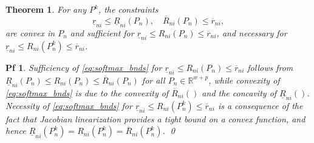 \documentclass[10pt,a4paper]{amsart}
\newtheorem{thm}{Theorem}
\newtheorem{pf}{Pf}
\DeclareMathOperator{\LSE}{LSE}
\begin{document}
\begin{thm}
For any $P^k$, the constraints
\begin{equation}\label{eq:softmax_bnds}
\underline{r}_{ni} \leq \underline{R}_{ni}(P_n), 
\quad
\overline{R}_{ni}(P_n) \leq \overline{r}_{ni},
\end{equation}
are convex in $P_n$ and sufficient for $\underline{r}_{ni} \leq R_{ni}(P_n) \leq \overline{r}_{ni}$, and necessary for $\underline{r}_{ni} \leq R_{ni}(P_n^k) \leq \overline{r}_{ni}$.
\end{thm}

\begin{pf}
Sufficiency of \eqref{eq:softmax_bnds} for $\underline{r}_{ni} \leq R_{ni}(P_n) \leq \overline{r}_{ni}$ 
follows from $\underline{R}_{ni}(P_{n}) \leq R_{ni}(P_n)\leq \overline{R}_{ni}(P_{n})$ for all $P_n\in \mathbb{R}^{w+p}$,
while convexity of \eqref{eq:softmax_bnds} 
is due to the convexity of $\overline{R}_{ni}()$ and the concavity of $\underline{R}_{ni}()$.
Necessity of \eqref{eq:softmax_bnds} for $\underline{r}_{ni} \leq R_{ni}(P_n^k) \leq \overline{r}_{ni}$ is a consequence of the fact that Jacobian linearization provides a tight bound on a convex function, and hence $\underline{R}_{ni}(P_n^k)=R_{ni}(P_n^k)=\overline{R}_{ni}(P_n^k)$.
\qed\end{pf}
\end{document}
